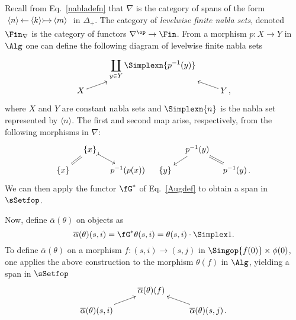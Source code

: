 \documentclass[a4paper]{article}
\numberwithin{equation}{section}
\begin{document}
Recall from Eq.~\ref{nabladefn} that $\nabla$ is the category of spans of the form $\xymatrixcolsep{.7pc} \xymatrix{ \langle n \rangle & \ar[l] \langle k \rangle \ar@{>->}[r] & \langle m \rangle}$ in $\Delta_+$. The category of {\em levelwise finite nabla sets}, denoted $\Fin_\nabla$ is the category of functors $\nabla^\op \to \Fin$. From a morphism $p:X \to Y$ in $\Alg$ one can define the following diagram of levelwise finite nabla sets
\begin{equation*}
\xymatrixrowsep{.7pc} \xymatrix{ & \displaystyle \coprod_{y \in Y} \Simplexn{p^{-1}(y)} & \\
 X \ar[ru] & & \ar[lu] Y\, ,}
\end{equation*}
where $X$ and $Y$ are constant nabla sets and $\Simplexn{ n}$ is the nabla set represented by $\langle n \rangle$. The first and second map arise, respectively, from the following morphisms in $\nabla$:
\begin{equation*}
\xymatrixrowsep{.7pc} \xymatrixcolsep{.9pc} \xymatrix{ & \{ x \} \ar@{=}[ld] \ar@{>->}[rd] & & & p^{-1}(y) \ar[ld] \ar@{=}[rd] & \\
\{ x \} & & p^{-1}(p(x)) & \{ y \} & & p^{-1}(y)\, .}
\end{equation*}
 We can then apply the functor $\fG^*$ of Eq.~\ref{Augdef} to obtain a span in $\sSetfop$.

Now, define $\overline{\alpha}(\theta)$ on objects as
\begin{equation*}
 \overline{\alpha}(\theta) (s,i) = \fG^* \theta(s,i) = \theta(s,i) \cdot \Simplex 1.
\end{equation*}
To define $\overline{\alpha}(\theta)$ on a morphism $f:(s,i) \to (s,j)$ in $\Singop{f(0)}\times\phi(0)$, one applies the above construction to the morphism $\theta(f)$ in $\Alg$, yielding a span in $\sSetfop$
\begin{equation*}
 \xymatrixrowsep{.7pc} \xymatrix{ & \overline{\alpha}(\theta)(f) & \\
 \overline{\alpha}(\theta)(s,i) \ar[ru] & & \ar[lu] \overline{\alpha}(\theta)(s,j) \, . }
\end{equation*}
\end{document}
